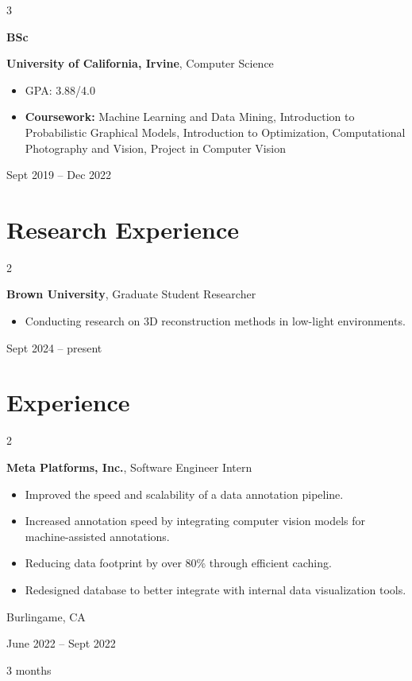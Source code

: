 \documentclass[10pt, letterpaper]{article}
\newenvironment{highlights}{
    \begin{itemize}[
        topsep=0.10 cm,
        parsep=0.10 cm,
        partopsep=0pt,
        itemsep=0pt,
        leftmargin=0.4 cm + 10pt
    ]
}{
    \end{itemize}
} %
\newenvironment{twocolentry}[2][]{
    \onecolentry
    \def\secondColumn{#2}
    \setcolumnwidth{\fill, 4.5 cm}
    \begin{paracol}{2}
}{
    \switchcolumn \raggedleft \secondColumn
    \end{paracol}
    \endonecolentry
} %
\newenvironment{threecolentry}[3][]{
    \onecolentry
    \def\thirdColumn{#3}
    \setcolumnwidth{1 cm, \fill, 4.5 cm}
    \begin{paracol}{3}
    {\raggedright #2} \switchcolumn
}{
    \switchcolumn \raggedleft \thirdColumn
    \end{paracol}
    \endonecolentry
} %
\begin{document}
        \begin{threecolentry}{\textbf{BSc}}{
            Sept 2019 – Dec 2022
        }
            \textbf{University of California, Irvine}, Computer Science
            \begin{highlights}
                \item GPA: 3.88/4.0
                \item \textbf{Coursework:} Machine Learning and Data Mining, Introduction to Probabilistic Graphical Models, Introduction to Optimization, Computational Photography and Vision, Project in Computer Vision
            \end{highlights}
        \end{threecolentry}


    
    \section{Research Experience}



        
        \begin{twocolentry}{
            Sept 2024 – present
        }
            \textbf{Brown University}, Graduate Student Researcher
            \begin{highlights}
                \item Conducting research on 3D reconstruction methods in low-light environments.
            \end{highlights}
        \end{twocolentry}



    
    \section{Experience}



        
        \begin{twocolentry}{
            Burlingame, CA

        June 2022 – Sept 2022

        3 months
        }
            \textbf{Meta Platforms, Inc.}, Software Engineer Intern
            \begin{highlights}
                \item Improved the speed and scalability of a data annotation pipeline.
                \item Increased annotation speed by integrating computer vision models for machine-assisted annotations.
                \item Reducing data footprint by over 80\% through efficient caching.
                \item Redesigned database to better integrate with internal data visualization tools.
            \end{highlights}
        \end{twocolentry}
\end{document}
